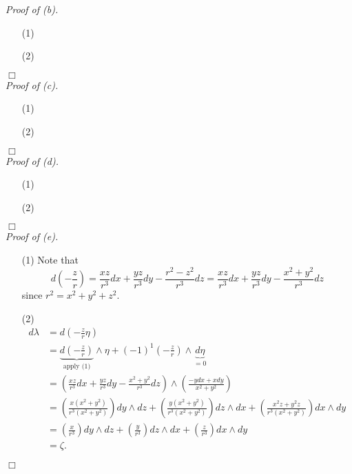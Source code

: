 \documentclass{article}
\begin{document}
\emph{Proof of (b).}
\begin{enumerate}
\item[(1)]
\item[(2)]

\end{enumerate}
$\Box$ \\



\emph{Proof of (c).}
\begin{enumerate}
\item[(1)]
\item[(2)]

\end{enumerate}
$\Box$ \\



\emph{Proof of (d).}
\begin{enumerate}
\item[(1)]
\item[(2)]

\end{enumerate}
$\Box$ \\



\emph{Proof of (e).}
\begin{enumerate}
\item[(1)]
  Note that
  \[
    d \left( -\frac{z}{r} \right)
    = \frac{xz}{r^3} dx + \frac{yz}{r^3} dy - \frac{r^2-z^2}{r^3} dz
    = \frac{xz}{r^3} dx + \frac{yz}{r^3} dy - \frac{x^2+y^2}{r^3} dz
  \]
  since $r^2 = x^2+y^2+z^2$.

\item[(2)]
  \begin{align*}
    d\lambda
    &= d \left( -\frac{z}{r}\eta \right) \\
    &= \underbrace{d \left( -\frac{z}{r} \right)}_{\text{apply (1)}} \wedge \eta
      + (-1)^1 \left( -\frac{z}{r} \right) \wedge \underbrace{d\eta}_{= 0} \\
    &= \left( \frac{xz}{r^3} dx + \frac{yz}{r^3} dy - \frac{x^2+y^2}{r^3} dz \right)
      \wedge \left( \frac{-ydx + xdy}{x^2+y^2} \right) \\
    &= \left( \frac{x(x^2+y^2)}{r^3(x^2+y^2)} \right) dy \wedge dz
      + \left( \frac{y(x^2+y^2)}{r^3(x^2+y^2)} \right) dz \wedge dx
      + \left( \frac{x^2 z + y^2 z}{r^3(x^2+y^2)} \right) dx \wedge dy \\
    &= \left( \frac{x}{r^3} \right) dy \wedge dz
      + \left( \frac{y}{r^3} \right) dz \wedge dx
      + \left( \frac{z}{r^3} \right) dx \wedge dy \\
    &= \zeta.
  \end{align*}
\end{enumerate}
$\Box$ \\
\end{document}
